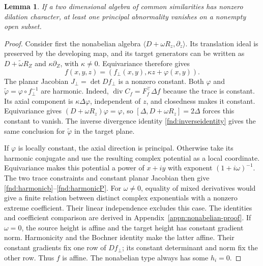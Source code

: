 \documentclass[11pt,a4paper]{article}
\numberwithin{equation}{section}
\theoremstyle{plain}
\newtheorem{lemma}[theorem]{Lemma}
\theoremstyle{definition}
\theoremstyle{remark}
\begin{document}
\begin{lemma}\label{fnd:two-similarity-generators}
If a two dimensional algebra of common similarities has nonzero
dilation character, at least one principal abnormality vanishes on
a nonempty open subset.
\end{lemma}
\begin{proof}
Consider first the nonabelian algebra
$\langle D+\omega R_z,\partial_z\rangle$.
Its translation ideal is preserved by the developing map, and its
target generators can be written as $D+\widetilde\omega R_Z$ and
$\kappa\partial_Z$, with $\kappa\ne0$. Equivariance therefore gives
\begin{equation}\label{fnd:nonabelianmap}
f(x,y,z)=(f_\perp(x,y),\kappa z+\varphi(x,y)).
\end{equation}
The planar Jacobian $J_\perp=\det Df_\perp$ is a nonzero constant.
Both $\varphi$ and
$\widetilde\varphi=\varphi\circ f_\perp^{-1}$ are harmonic.
Indeed, $\operatorname{div}C_f=F_f^{\top}\Delta f$ because the trace
is constant. Its axial component is $\kappa\Delta\varphi$,
independent of $z$, and closedness makes it constant. Equivariance
gives $(D+\omega R_z)\varphi=\varphi$, so
$[\Delta,D+\omega R_z]=2\Delta$ forces this constant to vanish.
The inverse divergence identity \eqref{fnd:inverseidentity} gives
the same conclusion for $\widetilde\varphi$ in the target plane.

If $\varphi$ is locally constant, the axial direction is principal.
Otherwise take its harmonic conjugate and use the resulting complex
potential as a local coordinate. Equivariance makes this potential
a power of $x+iy$ with exponent $(1+i\omega)^{-1}$.
The two trace constraints and constant planar Jacobian then give
\eqref{fnd:harmonicb}--\eqref{fnd:harmonicP}. For $\omega\ne0$,
equality of mixed derivatives would give a finite relation between
distinct complex exponentials with a nonzero extreme coefficient.
Their linear independence excludes this case. The identities and
coefficient comparison are derived in
Appendix~\ref{appn:nonabelian-proof}.
If $\omega=0$, the source height is affine and the target height has
constant gradient norm. Harmonicity and the Bochner identity make
the latter affine. Their constant gradients fix one row of
$Df_\perp$; its constant determinant and norm fix the other row.
Thus $f$ is affine. The nonabelian type always has some $h_i=0$.


\end{proof}
\end{document}
